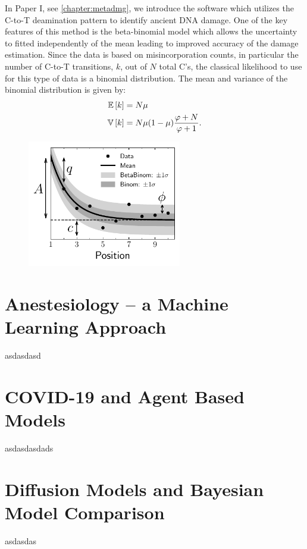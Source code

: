 In Paper I, see \autoref{chapter:metadmg}, we introduce the \metaDMG  software which utilizes the C-to-T deamination pattern to identify ancient DNA damage. One of the key features of this method is the beta-binomial model which allows the uncertainty to fitted independently of the mean leading to improved accuracy of the damage estimation. Since the data is based on misincorporation counts, in particular the number of C-to-T transitions, $k$, out of $N$ total C's, the classical likelihood  to use for this type of data is a binomial distribution. The mean and variance of the binomial distribution is given by:
\begin{equation}
    \begin{split}
        \mathbb{E}\left[{k}\right]  &= N \mu \\
        \mathbb{V}\left[{k}\right] &= N\mu(1-\mu) \frac{\varphi+N}{\varphi+1}.
        \label{eq:P_BetaBinom_expectation_variance}
    \end{split}
\end{equation}


\begin{figure}[htbp]
    \centering
    \includegraphics[width=0.6\textwidth]{figures/damage_sketch.pdf}
\end{figure}




\section{Anestesiology -- a Machine Learning Approach }
\label{section:machine-learning}

asdasdasd


\section{COVID-19 and Agent Based Models}
\label{section:agent-based-models}
asdasdasdads

\section{Diffusion Models and Bayesian Model Comparison}
\label{section:diffusion}
asdasdas
